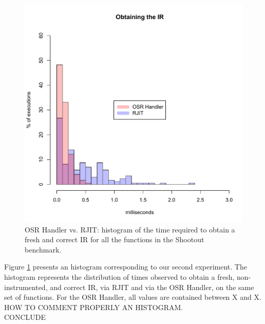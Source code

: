 \begin{figure}[h]
    \includegraphics[scale=0.9]{Figures/withoutJitAll}
    \caption{OSR Handler vs. RJIT: histogram of the time required to obtain a fresh and correct IR for all the functions in the Shootout benchmark.}
    \label{fig:withoutJitAll}
\end{figure}

Figure \ref{fig:withoutJitAll} presents an histogram corresponding to our second experiment.
The histogram represents the distribution of times observed to obtain a fresh, non-instrumented, and correct IR, via RJIT and via the OSR Handler, on the same set of functions.
For the OSR Handler, all values are contained between X and X.
HOW TO COMMENT PROPERLY AN HISTOGRAM.\\

CONCLUDE\\

